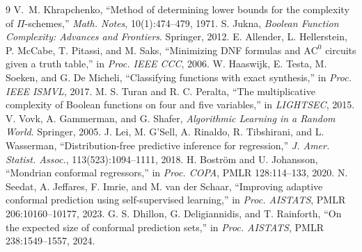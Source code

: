 \documentclass[10pt]{article}
\begin{document}
\begingroup
\footnotesize
\setlength{\parskip}{0pt}
\begin{thebibliography}{9}
\setlength{\itemsep}{0pt}
V.~M. Khrapchenko, ``Method of determining lower bounds for the complexity of
$\Pi$-schemes,'' \emph{Math. Notes}, 10(1):474--479, 1971.
S. Jukna, \emph{Boolean Function Complexity: Advances and Frontiers}.
Springer, 2012.
E. Allender, L. Hellerstein, P. McCabe, T. Pitassi, and M. Saks,
``Minimizing DNF formulas and $\mathrm{AC}^0$ circuits given a truth table,''
in \emph{Proc. IEEE CCC}, 2006.
W. Haaswijk, E. Testa, M. Soeken, and G. De Micheli,
``Classifying functions with exact synthesis,'' in \emph{Proc. IEEE ISMVL},
2017.
M. S. Turan and R. C. Peralta, ``The multiplicative complexity of Boolean
functions on four and five variables,'' in \emph{LIGHTSEC}, 2015.
V. Vovk, A. Gammerman, and G. Shafer,
\emph{Algorithmic Learning in a Random World}. Springer, 2005.
J. Lei, M. G'Sell, A. Rinaldo, R. Tibshirani, and L. Wasserman,
``Distribution-free predictive inference for regression,''
\emph{J. Amer. Statist. Assoc.}, 113(523):1094--1111, 2018.
H. Boström and U. Johansson, ``Mondrian conformal regressors,'' in
\emph{Proc. COPA}, PMLR 128:114--133, 2020.
N. Seedat, A. Jeffares, F. Imrie, and M. van der Schaar,
``Improving adaptive conformal prediction using self-supervised learning,''
in \emph{Proc. AISTATS}, PMLR 206:10160--10177, 2023.
G. S. Dhillon, G. Deligiannidis, and T. Rainforth,
``On the expected size of conformal prediction sets,'' in
\emph{Proc. AISTATS}, PMLR 238:1549--1557, 2024.
\end{thebibliography}
\endgroup
\end{document}
